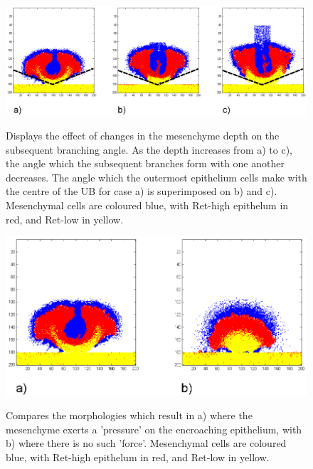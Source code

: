 \documentclass[pdftex,10pt,a4paper,twocolumn]{article}
\begin{document}
\begin{figure}[t] 
\centering
\scalebox{1.0} 
{\includegraphics{depth.eps}}
\caption{Displays the effect of changes in the mesenchyme depth on the subsequent branching angle. As the depth increases from a) to c), the angle which the subsequent branches form with one another decreases. The angle which the outermost epithelium cells make with the centre of the UB for case a) is superimposed on b) and c). Mesenchymal cells are coloured blue, with Ret-high epithelum in red, and Ret-low in yellow.}\label{fig:depth}
\end{figure} 

\begin{figure}[t] 
\centering
\scalebox{1.0} 
{\includegraphics{shell.eps}}
\caption{Compares the morphologies which result in a) where the mesenchyme exerts a 'pressure' on the encroaching epithelium, with b) where there is no such 'force'. Mesenchymal cells are coloured blue, with Ret-high epithelum in red, and Ret-low in yellow.}\label{fig:shell}
\end{figure} 
\end{document}
